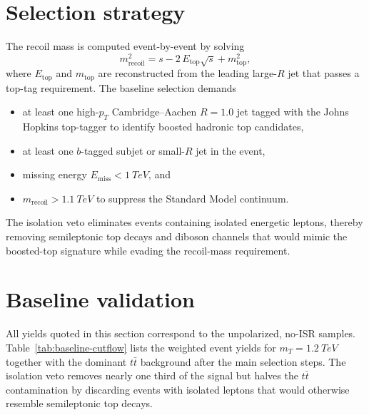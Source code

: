 \documentclass[11pt]{article}
\begin{document}
\section{Selection strategy}
The recoil mass is computed event-by-event by solving
\begin{equation}
  m_{\text{recoil}}^{2} = s - 2\,E_{\text{top}}\sqrt{s} + m_{\text{top}}^{2},
  \label{eq:recoilMass}
\end{equation}
where $E_{\text{top}}$ and $m_{\text{top}}$ are reconstructed from the
leading large-$R$ jet that passes a top-tag requirement.  The baseline
selection demands
\begin{itemize}
  \item at least one high-$p_{T}$ Cambridge--Aachen $R=1.0$ jet tagged with the
        Johns Hopkins top-tagger to identify boosted hadronic top candidates,
  \item at least one $b$-tagged subjet or small-$R$ jet in the event,
  \item missing energy $E_{\text{miss}} < \SI{1}{TeV}$, and
  \item $m_{\text{recoil}} > \SI{1.1}{TeV}$ to suppress the Standard Model
        continuum.
\end{itemize}

The isolation veto eliminates events containing isolated energetic leptons,
thereby removing semileptonic top decays and diboson channels that would mimic
the boosted-top signature while evading the recoil-mass requirement.

\section{Baseline validation}
All yields quoted in this section correspond to the unpolarized, no-ISR samples.
Table~\ref{tab:baseline-cutflow} lists the weighted event yields for
$m_{T}=\SI{1.2}{TeV}$ together with the dominant $t\bar{t}$ background after the
main selection steps.  The isolation veto removes nearly one third of the signal
but halves the $t\bar{t}$ contamination by discarding events with isolated
leptons that would otherwise resemble semileptonic top decays.
\end{document}
